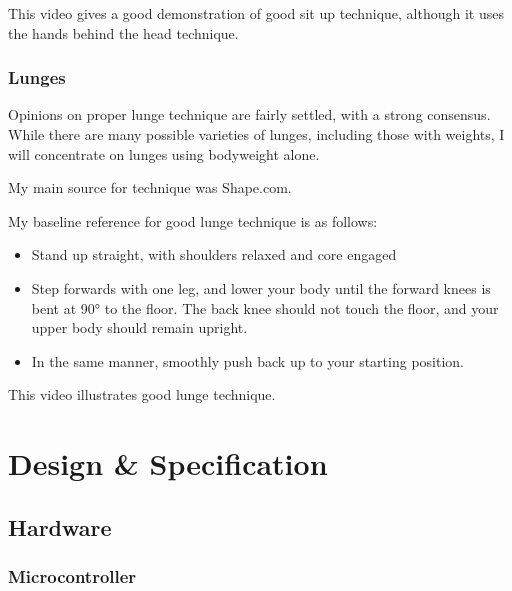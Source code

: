\documentclass[a4paper]{article}
\begin{document}
This video\cite{bgref23} gives a good demonstration of good sit up technique, although it uses the hands behind the head technique.

\subsubsection{Lunges}

Opinions on proper lunge technique are fairly settled, with a strong consensus. While there are many possible varieties of lunges, including those with weights, I will concentrate on lunges using bodyweight alone.

My main source for technique was Shape.com\cite{bgref24}.

My baseline reference for good lunge technique is as follows:

\begin{itemize}
    \item Stand up straight, with shoulders relaxed and core engaged
    \item Step forwards with one leg, and lower your body until the forward knees is bent at 90° to the floor. The back knee should not touch the floor, and your upper body should remain upright.
    \item In the same manner, smoothly push back up to your starting position.
\end{itemize}

This video\cite{bgref25} illustrates good lunge technique.

\newpage
\section{Design \& Specification}


\subsection{Hardware}%


\subsubsection{Microcontroller}
\end{document}
